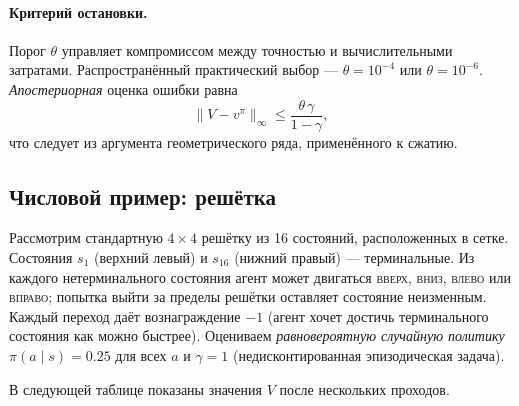 \paragraph{Критерий остановки.}
Порог $\theta$ управляет компромиссом между точностью и вычислительными затратами.  Распространённый практический выбор — $\theta = 10^{-4}$ или $\theta = 10^{-6}$.  \emph{Апостериорная} оценка ошибки равна
\[
\|V - v^\pi\|_\infty \le \frac{\theta\,\gamma}{1-\gamma},
\]
что следует из аргумента геометрического ряда, применённого к сжатию.

\subsection*{Числовой пример: решётка}

\begin{example}
\label{ex:gridworld-eval}
Рассмотрим стандартную $4\times4$ решётку из 16 состояний, расположенных в сетке.  Состояния $s_1$ (верхний левый) и $s_{16}$ (нижний правый) — терминальные.  Из каждого нетерминального состояния агент может двигаться \textsc{вверх}, \textsc{вниз}, \textsc{влево} или \textsc{вправо}; попытка выйти за пределы решётки оставляет состояние неизменным.  Каждый переход даёт вознаграждение $-1$ (агент хочет достичь терминального состояния как можно быстрее).  Оцениваем \emph{равновероятную случайную политику} $\pi(a \mid s) = 0.25$ для всех $a$ и $\gamma = 1$ (недисконтированная эпизодическая задача).

\medskip
\noindent
В следующей таблице показаны значения $V$ после нескольких проходов.


\end{example}
